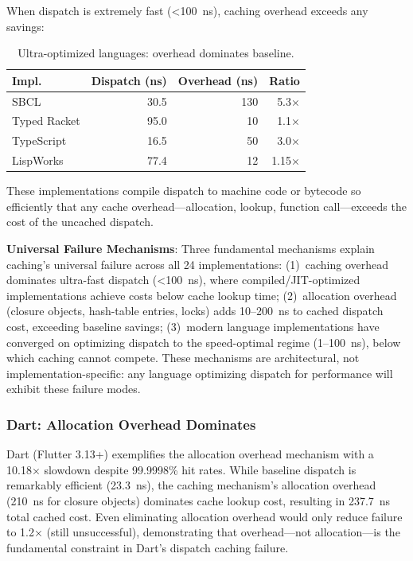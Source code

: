 \documentclass[sigplan,final,acmsmall,review,screen]{acmart}
\begin{document}
When dispatch is extremely fast (<100~ns), caching overhead exceeds any savings:

\begin{table}[h!]
\centering
\small
\caption{Ultra-optimized languages: overhead dominates baseline.}
\label{tab:mode1}
\begin{tabular}{@{}lrrr@{}}
\toprule
\textbf{Impl.} & \textbf{Dispatch (ns)} & \textbf{Overhead (ns)} & \textbf{Ratio} \\
\midrule
SBCL & 30.5 & 130 & 5.3× \\
Typed Racket & 95.0 & 10 & 1.1× \\
TypeScript & 16.5 & 50 & 3.0× \\
LispWorks & 77.4 & 12 & 1.15× \\
\bottomrule
\end{tabular}
\end{table}

These implementations compile dispatch to machine code or bytecode so efficiently that any
cache overhead—allocation, lookup, function call—exceeds the cost of the uncached dispatch.

\textbf{Universal Failure Mechanisms}: Three fundamental mechanisms explain caching's universal failure across all 24 implementations:
(1)~caching overhead dominates ultra-fast dispatch (<100~ns), where compiled/JIT-optimized implementations achieve costs below cache lookup time;
(2)~allocation overhead (closure objects, hash-table entries, locks) adds 10--200~ns to cached dispatch cost, exceeding baseline savings;
(3)~modern language implementations have converged on optimizing dispatch to the speed-optimal regime (1--100~ns), below which caching cannot compete.
These mechanisms are architectural, not implementation-specific: any language optimizing dispatch for performance will exhibit these failure modes.

\subsubsection{Dart: Allocation Overhead Dominates}

Dart (Flutter 3.13+) exemplifies the allocation overhead mechanism with a 10.18× slowdown despite 99.9998\% hit rates.
While baseline dispatch is remarkably efficient (23.3~ns), the caching mechanism's allocation overhead
(210~ns for closure objects) dominates cache lookup cost, resulting in 237.7~ns total cached cost.
Even eliminating allocation overhead would only reduce failure to 1.2× (still unsuccessful), demonstrating
that overhead—not allocation—is the fundamental constraint in Dart's dispatch caching failure.
\end{document}
